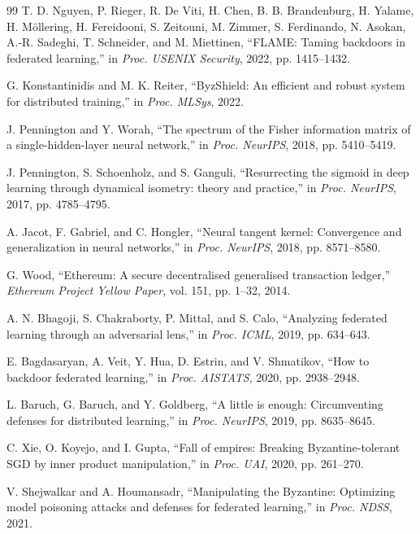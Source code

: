 \begin{thebibliography}{99}
 T. D. Nguyen, P. Rieger, R. De Viti, H. Chen, B. B. Brandenburg, H. Yalame, H. M{\"o}llering, H. Fereidooni, S. Zeitouni, M. Zimmer, S. Ferdinando, N. Asokan, A.-R. Sadeghi, T. Schneider, and M. Miettinen, ``FLAME: Taming backdoors in federated learning,'' in \textit{Proc. USENIX Security}, 2022, pp. 1415--1432.

 G. Konstantinidis and M. K. Reiter, ``ByzShield: An efficient and robust system for distributed training,'' in \textit{Proc. MLSys}, 2022.

 J. Pennington and Y. Worah, ``The spectrum of the Fisher information matrix of a single-hidden-layer neural network,'' in \textit{Proc. NeurIPS}, 2018, pp. 5410--5419.

 J. Pennington, S. Schoenholz, and S. Ganguli, ``Resurrecting the sigmoid in deep learning through dynamical isometry: theory and practice,'' in \textit{Proc. NeurIPS}, 2017, pp. 4785--4795.

 A. Jacot, F. Gabriel, and C. Hongler, ``Neural tangent kernel: Convergence and generalization in neural networks,'' in \textit{Proc. NeurIPS}, 2018, pp. 8571--8580.

 G. Wood, ``Ethereum: A secure decentralised generalised transaction ledger,'' \textit{Ethereum Project Yellow Paper}, vol. 151, pp. 1--32, 2014.

 A. N. Bhagoji, S. Chakraborty, P. Mittal, and S. Calo, ``Analyzing federated learning through an adversarial lens,'' in \textit{Proc. ICML}, 2019, pp. 634--643.

 E. Bagdasaryan, A. Veit, Y. Hua, D. Estrin, and V. Shmatikov, ``How to backdoor federated learning,'' in \textit{Proc. AISTATS}, 2020, pp. 2938--2948.

 L. Baruch, G. Baruch, and Y. Goldberg, ``A little is enough: Circumventing defenses for distributed learning,'' in \textit{Proc. NeurIPS}, 2019, pp. 8635--8645.

 C. Xie, O. Koyejo, and I. Gupta, ``Fall of empires: Breaking Byzantine-tolerant SGD by inner product manipulation,'' in \textit{Proc. UAI}, 2020, pp. 261--270.

 V. Shejwalkar and A. Houmansadr, ``Manipulating the Byzantine: Optimizing model poisoning attacks and defenses for federated learning,'' in \textit{Proc. NDSS}, 2021.


\end{thebibliography}
